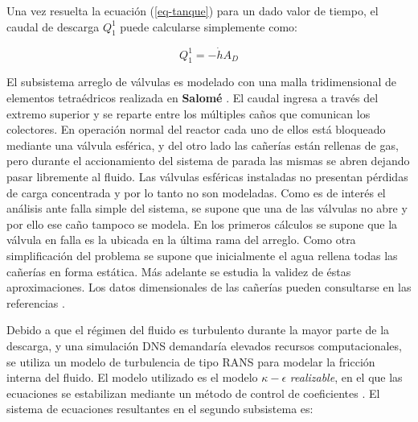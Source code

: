 Una vez resuelta la ecuación (\ref{eq-tanque}) para un dado valor de tiempo,
el caudal de descarga $Q_1^1$ puede calcularse simplemente como:

\begin{equation}
Q_1^1 = -\dot{h} A_D
\label{eq-qd}
\end{equation}

El subsistema arreglo de válvulas es modelado con una malla tridimensional de elementos tetraédricos realizada en \textbf{Salomé} \cite{salome}.
El caudal ingresa a través del extremo superior y se reparte entre los múltiples caños que comunican los colectores.
En operación normal del reactor cada uno de ellos está bloqueado mediante una válvula esférica,
y del otro lado las cañerías están rellenas de gas,
pero durante el accionamiento del sistema de parada las mismas se abren dejando pasar libremente al fluido.
Las válvulas esféricas instaladas no presentan pérdidas de carga concentrada y por lo tanto no son modeladas.
Como es de interés el análisis ante falla simple del sistema,
se supone que una de las válvulas no abre y por ello ese caño tampoco se modela.
En los primeros cálculos se supone que la válvula en falla es la ubicada en la última rama del arreglo.
Como otra simplificación del problema se supone que inicialmente el agua rellena todas las cañerías en forma estática.
Más adelante se estudia la validez de éstas aproximaciones.
Los datos dimensionales de las cañerías pueden consultarse en las referencias \cite{invap-mockup}.

Debido a que el régimen del fluido es turbulento durante la mayor parte de la descarga,
y una simulación DNS demandaría elevados recursos computacionales,
se utiliza un modelo de turbulencia de tipo RANS para modelar la fricción interna del fluido.
El modelo utilizado es el modelo $\kappa-\epsilon$ \textit{realizable}, en el que
las ecuaciones se estabilizan mediante un método de control de coeficientes \cite{k-e-realizable}.
El sistema de ecuaciones resultantes en el segundo subsistema es:

